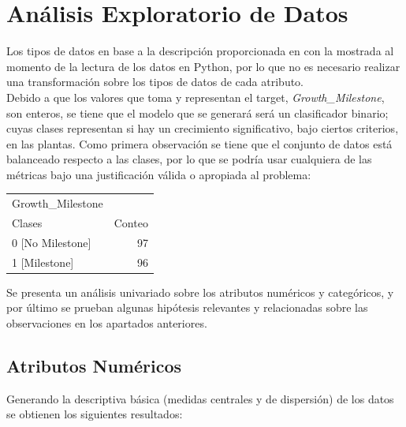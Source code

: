 \documentclass[12pt,a4paper]{article}
\begin{document}
    \section{Análisis Exploratorio de Datos}
    {
        Los tipos de datos en base a la descripción proporcionada en \cite{dataset_plants} 
        con la mostrada al momento de la lectura de los datos en Python, por lo que no 
        es necesario realizar una transformación sobre los tipos de datos de cada atributo. \\
        
        Debido a que los valores que toma y representan el target, \emph{Growth\_Milestone}, 
        son enteros, se tiene que el modelo que se generará será un clasificador binario; cuyas clases 
        representan si hay un crecimiento significativo, bajo ciertos criterios, en las plantas. 
        Como primera observación se tiene que el conjunto de datos está balanceado respecto 
        a las clases, por lo que se podría usar cualquiera de las métricas bajo una 
        justificación válida o apropiada al problema:

        \begin{center}
            \begin{tabular}{lr}
            \toprule
                Growth\_Milestone &  \\
                Clases & Conteo \\
            \midrule
                0 [No Milestone] & 97 \\
                1 [Milestone] & 96 \\
            \bottomrule
            \end{tabular}
        \end{center}
        
        Se presenta un análisis univariado sobre los atributos numéricos y categóricos, y 
        por último se prueban algunas hipótesis relevantes y relacionadas sobre las observaciones 
        en los apartados anteriores.\\

        \subsection{Atributos Numéricos}
        {
            Generando la descriptiva básica (medidas centrales y de dispersión) de 
            los datos se obtienen los siguientes resultados:

}}
\end{document}

